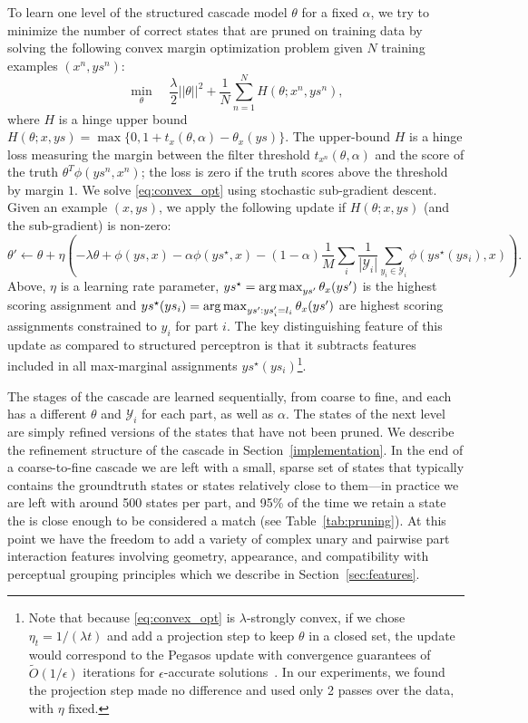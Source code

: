 To learn one level of the structured cascade model $\theta$ for a fixed $\alpha$, we try to minimize 
the number of correct states that are pruned on training data by solving the
following convex margin optimization problem given $N$ training examples $(x^n,ys^n)$:
\begin{equation}
  \label{eq:convex_opt}
 \min_{\theta} \;\;\;\ \frac{\lambda}{2}||\theta||^2 + \frac{1}{N}\sum_{n=1}^N H(\theta;x^n,ys^n),
\end{equation}
where $H$ is a hinge upper bound 
$H(\theta;x,ys) = \max\{0, 1 + t_x(\theta,\alpha) - \theta_x(ys)\}$.
The upper-bound $H$ is a hinge loss measuring the margin between the
filter threshold $t_{x^n}(\theta,\alpha)$ and the score of the truth
$\theta^T\phi(ys^n,x^n)$; the loss is zero if the truth scores above
the threshold by margin $1$.  We solve \eqref{eq:convex_opt} using stochastic
sub-gradient descent. Given an example $(x,ys)$, we apply the following
update if $H(\theta;x,ys)$ (and the sub-gradient) is non-zero:
\begin{equation*}
    \label{eq:spf_update}
    \theta'  \leftarrow \theta + \eta \left(-\lambda \theta + \phi(ys,x) - \alpha \phi(ys^\star,x)  - (1-\alpha) \frac{1}{M} \sum_{i} \frac{1}{|\mathcal{Y}_i|}\sum_{y_i \in \mathcal{Y}_i}  \phi(ys^\star(ys_i),x)\right).
\end{equation*}
Above, $\eta$ is a learning rate parameter, $ys^\star = \mathop{\arg\max}_{ys'}
\theta_x(ys')$ is the highest scoring assignment and $ys^\star(ys_i) = \mathop{\arg\max}_{ys': ys'_i = l_i} \theta_x(ys')$
are highest scoring assignments constrained to $y_i$ for part $i$.
The key distinguishing feature of this update as compared to
structured perceptron is that it subtracts features included in all
max-marginal assignments $ys^\star(ys_i)$\footnote{Note that because \eqref{eq:convex_opt} is $\lambda$-strongly convex,
if we chose $\eta_t = 1/(\lambda t)$ and add a projection step to keep 
$\theta$ in a closed set, the update would correspond to the Pegasos
update with convergence guarantees of $\tilde{O}(1/\epsilon)$ iterations for
$\epsilon$-accurate solutions~\cite{shalev-shwartz07pegasos}.  In our experiments, we found the projection step made no difference and used only 2 passes over the data, with $\eta$ fixed.}.

The stages of the cascade are learned sequentially, from coarse to fine, and each has a different $\theta$ and $\mathcal{Y}_i$ for each part, as well as  $\alpha$.  The states of the next level are simply refined versions of the states that have not been pruned. We describe 
the refinement structure of the cascade in Section~\ref{implementation}.
In the end of a coarse-to-fine cascade we are left with a small, sparse set of states that typically contains the groundtruth states or states relatively close to them---in practice we are left with around 500 states per part, and 95\% of the time we retain a state the is close enough to be considered a match (see Table~\ref{tab:pruning}). At this point we have the freedom to add a variety of complex unary and pairwise part interaction features involving geometry, appearance, and compatibility with perceptual grouping principles which we describe in Section~\ref{sec:features}.

